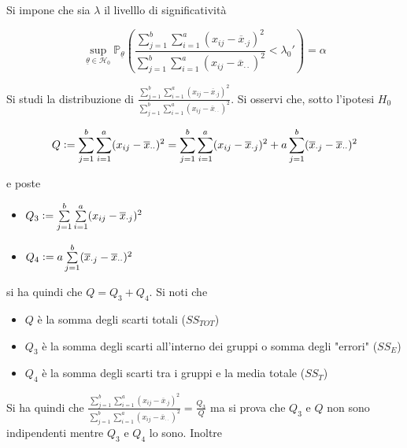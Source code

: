 \documentclass[hidelinks, 10pt]{article}
\begin{document}
Si impone che sia $ \lambda $ il livelllo di significativit\`a

\[ \sup\limits_{\underline{\theta} \in \mathcal{H}_{0}} \mathbb{P}_{\underline{\theta}} \left( \frac{\sum\limits_{j = 1}^{b} \sum\limits_{i = 1}^{a} (x_{ij} - \overline{x}_{\cdot j})^{2}}{\sum\limits_{j = 1}^{b} \sum\limits_{i = 1}^{a} (x_{ij} - \overline{x}_{\cdot \cdot})^{2}} < \lambda_{0}' \right) = \alpha \]

Si studi la distribuzione di $ \frac{\sum\limits_{j = 1}^{b} \sum\limits_{i = 1}^{a} (x_{ij} - \overline{x}_{\cdot j})^{2}}{\sum\limits_{j = 1}^{b} \sum\limits_{i = 1}^{a} (x_{ij} - \overline{x}_{\cdot \cdot})^{2}} $. Si osservi che, sotto l'ipotesi $ H_{0} $

\[ Q \vcentcolon= \sum\limits_{j = 1}^{b} \sum\limits_{i = 1}^{a} (x_{ij} - \overline{x}_{\cdot \cdot})^{2} = \sum\limits_{j = 1}^{b} \sum\limits_{i = 1}^{a} (x_{ij} - \overline{x}_{\cdot j})^{2} + a \sum\limits_{j = 1}^{b} (\overline{x}_{\cdot j} - \overline{x}_{\cdot \cdot})^{2} \]

e poste

\begin{itemize}
\item $ Q_{3} \vcentcolon= \sum\limits_{j = 1}^{b} \sum\limits_{i = 1}^{a} (x_{ij} - \overline{x}_{\cdot j})^{2} $
\item $ Q_{4} \vcentcolon= a \sum\limits_{j = 1}^{b} (\overline{x}_{\cdot j} - \overline{x}_{\cdot \cdot})^{2} $
\end{itemize}

si ha quindi che $ Q = Q_{3} + Q_{4} $. Si noti che
\begin{itemize}
\item $ Q $ \`e la somma degli scarti totali ($ SS_{TOT} $)
\item $ Q_{3} $ \`e la somma degli scarti all'interno dei gruppi o somma degli "errori" ($ SS_{E} $)
\item $ Q_{4} $ \`e la somma degli scarti tra i gruppi e la media totale ($ SS_{T} $)
\end{itemize}

Si ha quindi che $ \frac{\sum\limits_{j = 1}^{b} \sum\limits_{i = 1}^{a} (x_{ij} - \overline{x}_{\cdot j})^{2}}{\sum\limits_{j = 1}^{b} \sum\limits_{i = 1}^{a} (x_{ij} - \overline{x}_{\cdot \cdot})^{2}} = \frac{Q_{3}}{Q} $ ma si prova che $ Q_{3} $ e $ Q $ non sono indipendenti mentre $ Q_{3} $ e $ Q_{4} $ lo sono. Inoltre
\end{document}
